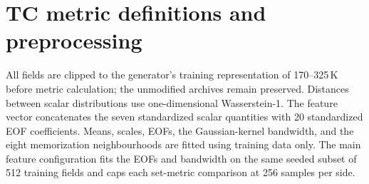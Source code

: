 \documentclass[gmd, manuscript]{copernicus}
\begin{document}


\section{TC metric definitions and preprocessing}
\label{sec:smetrics}

All fields are clipped to the generator's training representation of
170--325\,K before metric calculation; the unmodified archives remain preserved.
Distances between scalar distributions use one-dimensional Wasserstein-1. The
feature vector concatenates the seven standardized scalar quantities with 20
standardized EOF coefficients. Means, scales, EOFs, the Gaussian-kernel bandwidth,
and the eight memorization neighbourhoods are fitted using training data only. The
main feature configuration fits the EOFs and bandwidth on the same seeded subset of
512 training fields and caps each set-metric comparison at 256 samples per side.
\end{document}
